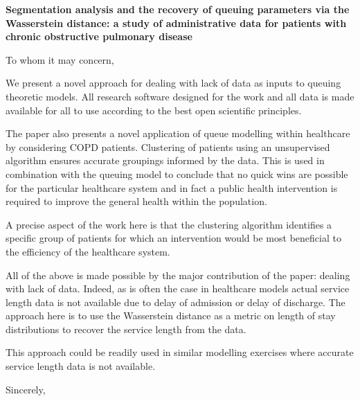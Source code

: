 \documentclass[11pt]{letter}
\begin{document}
\signature{The authors}

\begin{letter}{}

\textbf{
  Segmentation analysis and the recovery of queuing parameters via the
  Wasserstein distance: a study of administrative data for patients with chronic
  obstructive pulmonary disease
}

To whom it may concern,

We present a novel approach for dealing with lack of data as inputs to queuing
theoretic models. All research software designed for the work
and all data is made available for all to use according to the best open
scientific principles.

The paper also presents a novel application of queue modelling within healthcare
by considering COPD patients. Clustering of patients using an unsupervised
algorithm ensures accurate groupings informed by the data. This is used in
combination with the queuing model to conclude that no quick wins are possible
for the particular healthcare system and in fact a public health
intervention is required to improve the general health within the population.

A precise aspect of the work here is that the clustering algorithm identifies a
specific group of patients for which an intervention would be most
beneficial to the efficiency of the healthcare system.

All of the above is made possible by the major contribution of the paper:
dealing with lack of data. Indeed, as is often the case in healthcare models
actual service length data is not available due to delay of admission or
delay of discharge. The approach here is to use the Wasserstein distance as a
metric on length of stay distributions to recover the service length from
the data.

This approach could be readily used in similar modelling exercises
where accurate service length data is not available.

\closing{Sincerely,}

\end{letter}
\end{document}
